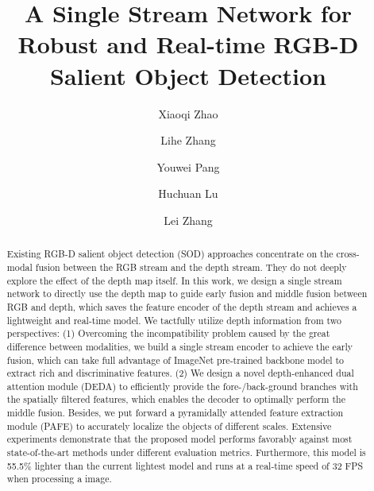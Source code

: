 \documentclass[runningheads]{llncs}
\begin{document}
\pagestyle{headings}
\mainmatter
\def\ECCVSubNumber{4160}  

\title{A Single Stream Network for Robust and Real-time RGB-D Salient Object Detection} 


\begin{comment}
\titlerunning{ECCV-20 submission ID \ECCVSubNumber} 
\authorrunning{ECCV-20 submission ID \ECCVSubNumber} 
\author{Anonymous ECCV submission}
\institute{Paper ID \ECCVSubNumber}
\end{comment}


\author{Xiaoqi Zhao \and
Lihe Zhang\protect\footnotemark[1]\and
Youwei Pang\and Huchuan Lu\and Lei Zhang}
\maketitle
\renewcommand{\thefootnote}{\fnsymbol{footnote}}  \renewcommand{\thefootnote}{\arabic{footnote}}
\begin{abstract}
Existing RGB-D salient object detection (SOD) approaches concentrate on the cross-modal fusion between the RGB stream and the depth stream. They do not deeply explore the effect of the depth map itself. In this work, we design a single stream network to directly use the depth map to guide early fusion and middle fusion between RGB and depth, which saves the feature encoder of the depth stream and achieves a lightweight and real-time model.        
We tactfully utilize depth information from two perspectives: (1) Overcoming the incompatibility problem caused by the great difference between modalities, we build a single stream encoder to achieve the early fusion, which can take full advantage of ImageNet pre-trained backbone model to extract rich and discriminative features. 
(2) We design a novel depth-enhanced dual attention module (DEDA) to efficiently provide the fore-/back-ground branches with the spatially filtered features, which enables the decoder to optimally perform the middle fusion. Besides, we put forward a pyramidally attended feature extraction module (PAFE) to accurately localize the objects of different scales. Extensive experiments demonstrate that the proposed model performs favorably against most state-of-the-art methods under different evaluation metrics. Furthermore, this model is 55.5\% lighter than the current lightest model and runs at a real-time speed of 32 FPS when processing a  image. 
\end{abstract}
\end{document}
